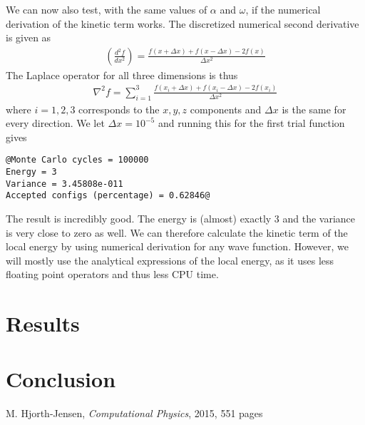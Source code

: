 \documentclass[12pt]{article}
\begin{document}
We can now also test, with the same values of $\alpha$ and $\omega$, if the numerical derivation of the kinetic term works. The discretized numerical second derivative is given as
\begin{align*}
\left(\frac{d^2f}{dx^2}\right) = \frac{f(x + \Delta x) + f(x - \Delta x) - 2f(x)}{\Delta x^2}
\end{align*}
The Laplace operator for all three dimensions is thus
\begin{align*}
\nabla^2 f = \displaystyle \sum_{i=1}^3 \frac{f(x_i + \Delta x) + f(x_i - \Delta x) - 2f(x_i)}{\Delta x^2} 
\end{align*}
where $i=1,2,3$ corresponds to the $x,y,z$ components and $\Delta x$ is the same for every direction. We let $\Delta x = 10^{-5}$ and running this for the first trial function gives
\begin{lstlisting}
@Monte Carlo cycles = 100000
Energy = 3
Variance = 3.45808e-011
Accepted configs (percentage) = 0.62846@
\end{lstlisting}
The result is incredibly good. The energy is (almost) exactly 3 and the variance is very close to zero as well. We can therefore calculate the kinetic term of the local energy by using numerical derivation for any wave function. However, we will mostly use the analytical expressions of the local energy, as it uses less floating point operators and thus less CPU time.
\section{Results}\label{section:results}

\FloatBarrier
\section{Conclusion}\label{section:conclusion}

\FloatBarrier
\begin{thebibliography}{1}
     M. Hjorth-Jensen, \emph{Computational Physics}, 2015, 551 pages
\end{thebibliography}
\end{document}

